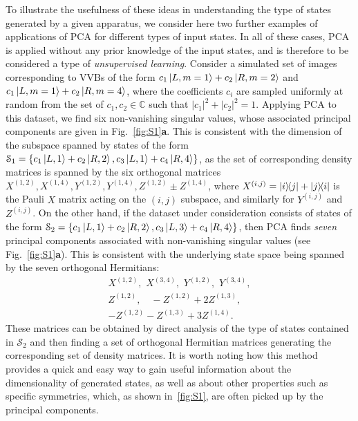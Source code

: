 \documentclass[
    floatfix, aps, pra, superscriptaddress,
	10pt, twocolumn,
    nofootinbib,
	tightenlines
]{revtex4-1}
\begin{document}
To illustrate the usefulness of these ideas in understanding the type of states generated by a given apparatus, we consider here two further examples of applications of \ac{PCA} for different types of input states. 
In all of these cases, \ac{PCA} is applied without any prior knowledge of the input states, and is therefore to be considered a type of \emph{unsupervised learning}.
Consider a simulated set of images corresponding to VVBs of the form
$c_1\ket{L,m=1}+c_2\ket{R,m=2}$ and
$c_1\ket{L,m=1}+c_2\ket{R,m=4}$, where the coefficients $c_i$ are sampled uniformly at random from the set of $c_{1},c_2\in\mathbb{C}$  such that $|c_1|^2+|c_2|^2=1$.
Applying PCA to this dataset, we find six non-vanishing singular values, whose associated principal components are given in Fig.~\ref{fig:S1}\textbf{a}.
This is consistent with the dimension of the subspace  spanned by states of the form $\mathcal S_1=\{c_1\ket{L,1}+c_2\ket{R,2}, c_3\ket{L,1}+c_4\ket{R,4}\}$,  as the set of corresponding density matrices is spanned by the six orthogonal matrices
$X^{(1,2)}, X^{(1,4)}, Y^{(1,2)},Y^{(1,4)},Z^{(1,2)}\pm Z^{(1,4)}$, where $X^{(i,j)}=\ketbra{i}{j}+\ketbra{j}{i}$ is the Pauli $X$ matrix acting on the $(i,j)$ subspace, and similarly for $Y^{(i,j)}$ and $Z^{(i,j)}$.
On the other hand, if the dataset under consideration consists of states of the form $\mathcal S_2=\{c_1\ket{L,1}+c_2\ket{R,2}, c_3\ket{L,3}+c_4\ket{R,4}\}$, then \ac{PCA} finds \emph{seven} principal components associated with non-vanishing singular values (see Fig.~\ref{fig:S1}\textbf{a}).
This is consistent with the underlying state space being spanned by the seven orthogonal Hermitians:
\begin{equation}
\begin{gathered}
    X^{(1,2)}, \,\, X^{(3,4)}, \,\,
    Y^{(1,2)}, \,\, Y^{(3,4)}, \\
    Z^{(1,2)},\quad
    -Z^{(1,2)} + 2 Z^{(1,3)}, \\
    -Z^{(1,2)} - Z^{(1,3)} + 3 Z^{(1,4)}.
\end{gathered}
\end{equation}
These matrices can be obtained by direct analysis of the type of states contained in $\mathcal S_2$ and then finding a set of orthogonal Hermitian matrices generating the corresponding set of density matrices.
It is worth noting how this method provides a quick and easy way to gain useful information about the dimensionality of generated states, as well as about other properties such as specific symmetries, which, as shown in~\cref{fig:S1}, are often picked up by the principal components.
\end{document}
